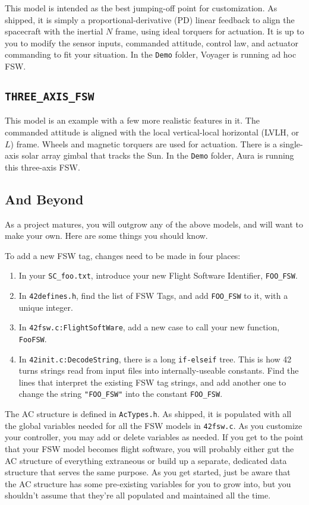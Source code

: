 \documentclass[12pt]{article}
\begin{document}
This model is intended as the best jumping-off point for customization.  As shipped, it is simply a proportional-derivative (PD) linear feedback to align the spacecraft with the inertial $N$ frame, using ideal torquers for actuation.  It is up to you to modify the sensor inputs, commanded attitude, control law, and actuator commanding to fit your situation.  In the {\tt Demo} folder, Voyager is running ad hoc FSW.

\subsection{\tt THREE\_AXIS\_FSW}

This model is an example with a few more realistic features in it.  The commanded attitude is aligned with the local vertical-local horizontal (LVLH, or $L$) frame.  Wheels and magnetic torquers are used for actuation.  There is a single-axis solar array gimbal that tracks the Sun.  In the {\tt Demo} folder, Aura is running this three-axis FSW.

\subsection{And Beyond}

As a project matures, you will outgrow any of the above models, and will want to make your own.  Here are some things you should know.

To add a new FSW tag, changes need to be made in four places:
\begin{enumerate}
\item In your {\tt SC\_foo.txt}, introduce your new Flight Software Identifier, {\tt FOO\_FSW}.
\item In {\tt 42defines.h}, find the list of FSW Tags, and add {\tt FOO\_FSW} to it, with a unique integer.
\item In {\tt 42fsw.c:FlightSoftWare}, add a new case to call your new function, {\tt FooFSW}.
\item In {\tt 42init.c:DecodeString}, there is a long {\tt if-elseif} tree.  This is how 42 turns strings read from input files into internally-useable constants.  Find the lines that interpret the existing FSW tag strings, and add another one to change the string {\tt "FOO\_FSW"} into the constant {\tt FOO\_FSW}. 
\end{enumerate}

The AC structure is defined in {\tt AcTypes.h}.  As shipped, it is populated with all the global variables needed for all the FSW models in {\tt 42fsw.c}.  As you customize your controller, you may add or delete variables as needed.  If you get to the point that your FSW model becomes flight software, you will probably either gut the AC structure of everything extraneous or build up a separate, dedicated data structure that serves the same purpose.  As you get started, just be aware that the AC structure has some pre-existing variables for you to grow into, but you shouldn't assume that they're all populated and maintained all the time.
\end{document}
